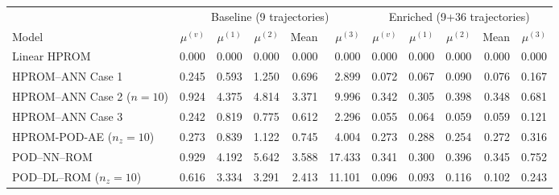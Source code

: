 \begin{tabular}{lrrrrr|rrrrr}
\toprule
& \multicolumn{5}{c|}{Baseline (9 trajectories)} & \multicolumn{5}{c}{Enriched (9+36 trajectories)} \\
Model & $\mu^{(v)}$ & $\mu^{(1)}$ & $\mu^{(2)}$ & Mean & $\mu^{(3)}$ & $\mu^{(v)}$ & $\mu^{(1)}$ & $\mu^{(2)}$ & Mean & $\mu^{(3)}$ \\
\midrule
Linear HPROM & 0.000 & 0.000 & 0.000 & 0.000 & 0.000 & 0.000 & 0.000 & 0.000 & 0.000 & 0.000 \\
HPROM--ANN Case 1 & 0.245 & 0.593 & 1.250 & 0.696 & 2.899 & 0.072 & 0.067 & 0.090 & 0.076 & 0.167 \\
HPROM--ANN Case 2 ($n=10$) & 0.924 & 4.375 & 4.814 & 3.371 & 9.996 & 0.342 & 0.305 & 0.398 & 0.348 & 0.681 \\
HPROM--ANN Case 3 & 0.242 & 0.819 & 0.775 & 0.612 & 2.296 & 0.055 & 0.064 & 0.059 & 0.059 & 0.121 \\
HPROM-POD-AE ($n_z=10$) & 0.273 & 0.839 & 1.122 & 0.745 & 4.004 & 0.273 & 0.288 & 0.254 & 0.272 & 0.316 \\
\midrule
POD--NN--ROM & 0.929 & 4.192 & 5.642 & 3.588 & 17.433 & 0.341 & 0.300 & 0.396 & 0.345 & 0.752 \\
POD--DL--ROM ($n_z=10$) & 0.616 & 3.334 & 3.291 & 2.413 & 11.101 & 0.096 & 0.093 & 0.116 & 0.102 & 0.243 \\
\bottomrule
\end{tabular}
